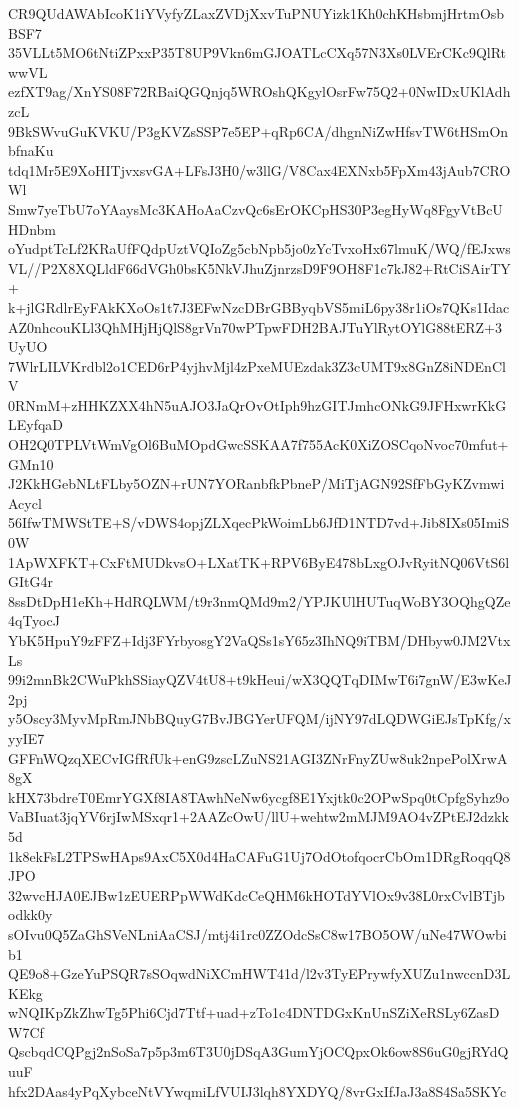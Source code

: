 CR9QUdAWAbIcoK1iYVyfyZLaxZVDjXxvTuPNUYizk1Kh0chKHsbmjHrtmOsbBSF7
35VLLt5MO6tNtiZPxxP35T8UP9Vkn6mGJOATLcCXq57N3Xs0LVErCKc9QlRtwwVL
ezfXT9ag/XnYS08F72RBaiQGQnjq5WROshQKgylOsrFw75Q2+0NwIDxUKlAdhzcL
9BkSWvuGuKVKU/P3gKVZsSSP7e5EP+qRp6CA/dhgnNiZwHfsvTW6tHSmOnbfnaKu
tdq1Mr5E9XoHITjvxsvGA+LFsJ3H0/w3llG/V8Cax4EXNxb5FpXm43jAub7CROWl
Smw7yeTbU7oYAaysMc3KAHoAaCzvQc6sErOKCpHS30P3egHyWq8FgyVtBcUHDnbm
oYudptTcLf2KRaUfFQdpUztVQIoZg5cbNpb5jo0zYcTvxoHx67lmuK/WQ/fEJxws
VL//P2X8XQLldF66dVGh0bsK5NkVJhuZjnrzsD9F9OH8F1c7kJ82+RtCiSAirTY+
k+jlGRdlrEyFAkKXoOs1t7J3EFwNzcDBrGBByqbVS5miL6py38r1iOs7QKs1Idac
AZ0nhcouKLl3QhMHjHjQlS8grVn70wPTpwFDH2BAJTuYlRytOYlG88tERZ+3UyUO
7WlrLILVKrdbl2o1CED6rP4yjhvMjl4zPxeMUEzdak3Z3cUMT9x8GnZ8iNDEnClV
0RNmM+zHHKZXX4hN5uAJO3JaQrOvOtIph9hzGITJmhcONkG9JFHxwrKkGLEyfqaD
OH2Q0TPLVtWmVgOl6BuMOpdGwcSSKAA7f755AcK0XiZOSCqoNvoc70mfut+GMn10
J2KkHGebNLtFLby5OZN+rUN7YORanbfkPbneP/MiTjAGN92SfFbGyKZvmwiAcycl
56IfwTMWStTE+S/vDWS4opjZLXqecPkWoimLb6JfD1NTD7vd+Jib8IXs05ImiS0W
1ApWXFKT+CxFtMUDkvsO+LXatTK+RPV6ByE478bLxgOJvRyitNQ06VtS6lGItG4r
8ssDtDpH1eKh+HdRQLWM/t9r3nmQMd9m2/YPJKUlHUTuqWoBY3OQhgQZe4qTyocJ
YbK5HpuY9zFFZ+Idj3FYrbyosgY2VaQSs1sY65z3IhNQ9iTBM/DHbyw0JM2VtxLs
99i2mnBk2CWuPkhSSiayQZV4tU8+t9kHeui/wX3QQTqDIMwT6i7gnW/E3wKeJ2pj
y5Oscy3MyvMpRmJNbBQuyG7BvJBGYerUFQM/ijNY97dLQDWGiEJsTpKfg/xyyIE7
GFFnWQzqXECvIGfRfUk+enG9zscLZuNS21AGI3ZNrFnyZUw8uk2npePolXrwA8gX
kHX73bdreT0EmrYGXf8IA8TAwhNeNw6ycgf8E1Yxjtk0c2OPwSpq0tCpfgSyhz9o
VaBIuat3jqYV6rjIwMSxqr1+2AAZcOwU/llU+wehtw2mMJM9AO4vZPtEJ2dzkk5d
1k8ekFsL2TPSwHAps9AxC5X0d4HaCAFuG1Uj7OdOtofqocrCbOm1DRgRoqqQ8JPO
32wvcHJA0EJBw1zEUERPpWWdKdcCeQHM6kHOTdYVlOx9v38L0rxCvlBTjbodkk0y
sOIvu0Q5ZaGhSVeNLniAaCSJ/mtj4i1rc0ZZOdcSsC8w17BO5OW/uNe47WOwbib1
QE9o8+GzeYuPSQR7sSOqwdNiXCmHWT41d/l2v3TyEPrywfyXUZu1nwccnD3LKEkg
wNQIKpZkZhwTg5Phi6Cjd7Ttf+uad+zTo1c4DNTDGxKnUnSZiXeRSLy6ZasDW7Cf
QscbqdCQPgj2nSoSa7p5p3m6T3U0jDSqA3GumYjOCQpxOk6ow8S6uG0gjRYdQuuF
hfx2DAas4yPqXybceNtVYwqmiLfVUIJ3lqh8YXDYQ/8vrGxIfJaJ3a8S4Sa5SKYc
